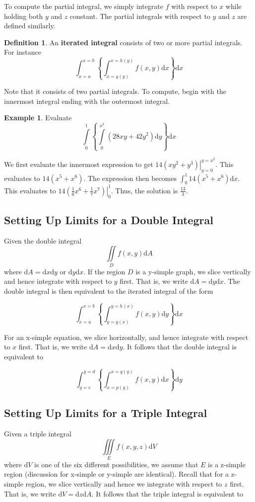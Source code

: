 \documentclass[11pt]{article}
\theoremstyle{plain} %
\theoremstyle{definition}
\newtheorem*{definition}{Definition} %
\theoremstyle{example}
\newtheorem*{example}{Example}
\theoremstyle{remark}
\begin{document}
To compute the partial integral, we simply integrate $f$ with respect to $x$ while holding both $y$ and $z$ constant. The partial integrals with respect to $y$ and $z$ are defined similarly. 

\begin{definition}
An \textbf{iterated integral} consists of two or more partial integrals. For instance
$$\int_{x=a}^{x=b} \left\{\int_{x=g(y)}^{x=h(y)} f(x,y) \mathrm d x\right\}\mathrm d x$$
\end{definition}

Note that it consists of two partial integrals. To compute, begin with the innermost integral ending with the outermost integral. 

\begin{example}
Evaluate $$\int \limits_{0}^{1} \left\{\int\limits_{0}^{x^2} \left(28xy+42y^2\right) \mathrm d y\right\}\mathrm d x$$
\end{example}

We first evaluate the innermost expression to get $\left.14\left(xy^2+y^3\right) \right|_{y=0}^{y=x^2}$. This evaluates to $14\left(x^5+x^6\right)$. The expression then becomes $\int_0^1 14\left(x^5+x^6\right)\mathrm d x$. This evaluates to $\left.14\left(\frac{1}{6}x^6+\frac{1}{7}x^7\right)\right|_0^1$. Thus, the solution is $\frac{13}{3}$. 

\subsection{Setting Up Limits for a Double Integral}

Given the double integral $$\iint\limits_Df(x,y) \mathrm d A$$ where $\mathrm d A = \mathrm d x \mathrm d y$ or $\mathrm d y \mathrm d x$. If the region $ D$ is a y-simple graph, we slice vertically and hence integrate with respect to $y$ first. That is, we write $\mathrm d A = \mathrm d y \mathrm d x$. The double integral is then equivalent to the iterated integral of the form

$$\int_{x=a}^{x=b}\left\{\int_{y=g(x)}^{y=h(x)} f(x,y) \mathrm d y \right\}\mathrm d x$$

For an x-simple equation, we slice horizontally, and hence integrate with respect to $x$ first. That is, we write $\mathrm d A = \mathrm d x \mathrm d y$. It follows that the double integral is equivalent to 

$$\int_{y=c}^{y=d}\left\{\int_{x=p(y)}^{x=q(y)} f(x,y) \mathrm d x \right\}\mathrm d y$$


\subsection{Setting Up Limits for a Triple Integral}
Given a triple integral $$\iiint\limits_E f(x, y, z)\mathrm d V$$ where $\mathrm d V$ is one of the six different possibilities, we assume that $E$ is a z-simple region (discussion for x-simple or y-simple are identical). Recall that for a z-simple region, we slice vertically and hence we integrate with respect to $z$ first. That is, we write $\mathrm d V = \mathrm d z \mathrm d A$. It follows that the triple integral is equivalent to 
\end{document}
